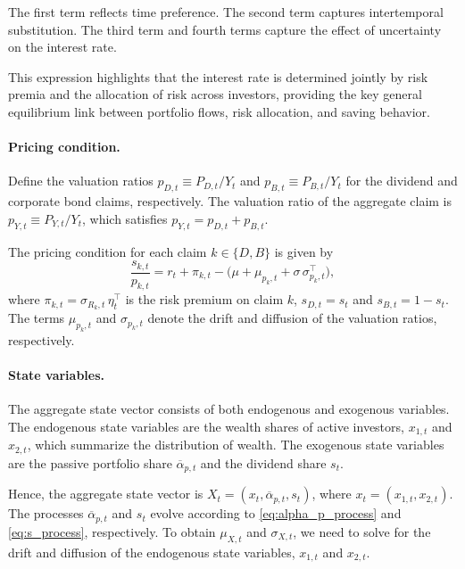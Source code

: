 \documentclass[12pt,english]{article}
\begin{document}
The first term reflects time preference.
The second term captures intertemporal substitution.
The third term and fourth terms capture the effect of uncertainty on the interest rate.

This expression highlights that the interest rate is determined jointly by risk premia and the allocation of risk across investors, providing the key general equilibrium link between portfolio flows, risk allocation, and saving behavior.


\paragraph{Pricing condition.}

Define the valuation ratios $p_{D,t} \equiv P_{D,t}/Y_t$ and $p_{B,t} \equiv P_{B,t}/Y_t$ for the dividend and corporate bond claims, respectively. 
The valuation ratio of the aggregate claim is $p_{Y,t} \equiv P_{Y,t}/Y_t$, which satisfies $p_{Y,t} = p_{D,t} + p_{B,t}$.

The pricing condition for each claim $k\in\{D,B\}$ is given by
\begin{equation}\label{eq:pricing_cond}
    \frac{s_{k,t}}{p_{k,t}} = r_t + \pi_{k,t} - \big(\mu + \mu_{p_k,t} + \sigma \, \sigma_{p_k,t}^\top\big),
\end{equation}
where $\pi_{k,t} = \sigma_{R_k,t} \, \eta_t^\top$ is the risk premium on claim $k$, $s_{D,t} = s_t$ and $s_{B,t} = 1-s_t$.
The terms $\mu_{p_k,t}$ and $\sigma_{p_k,t}$ denote the drift and diffusion of the valuation ratios, respectively.


\paragraph{State variables.}

The aggregate state vector consists of both endogenous and exogenous variables.
The endogenous state variables are the wealth shares of active investors, $x_{1,t}$ and $x_{2,t}$, which summarize the distribution of wealth.
The exogenous state variables are the passive portfolio share $\overline{\alpha}_{p,t}$ and the dividend share $s_t$.

Hence, the aggregate state vector is $X_t = (x_t, \overline{\alpha}_{p,t}, s_t)$, where $x_t = (x_{1,t}, x_{2,t})$.
The processes $\overline{\alpha}_{p,t}$ and $s_t$ evolve according to \eqref{eq:alpha_p_process} and \eqref{eq:s_process}, respectively.
To obtain $\mu_{X,t}$ and $\sigma_{X,t}$, we need to solve for the drift and diffusion of the endogenous state variables, $x_{1,t}$ and $x_{2,t}$.
\end{document}
